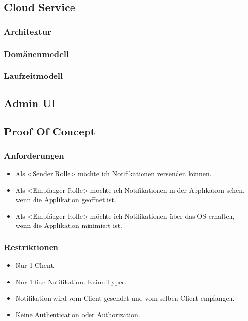 \clearpage
\subsection{Cloud Service}
    \subsubsection{Architektur}
    \subsubsection{Domänenmodell}
    \subsubsection{Laufzeitmodell}

\clearpage
\subsection{Admin UI}

\clearpage
\subsection{Proof Of Concept}
    \subsubsection*{Anforderungen}
        \begin{itemize}
            \item Als <Sender Rolle> möchte ich Notifikationen versenden können. 
            \item Als <Empfänger Rolle> möchte ich Notifikationen in der Applikation sehen, wenn die Applikation geöffnet ist.  
            \item Als <Empfänger Rolle> möchte ich Notifikationen über das OS erhalten, wenn die Applikation minimiert ist. 
        \end{itemize}
    \subsubsection*{Restriktionen}
        \begin{itemize}
            \item Nur 1 Client. 
            \item Nur 1 fixe Notifikation. Keine Types. 
            \item Notifikation wird vom Client gesendet und vom selben Client empfangen. 
            \item Keine Authentication oder Authorization. 
        \end{itemize}
